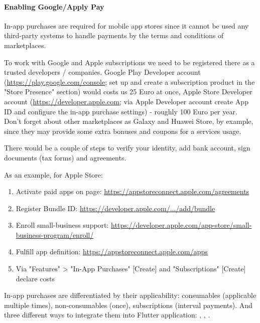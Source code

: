 \paragraph{Enabling Google/Apply Pay}

In-app purchases are required for mobile app stores since it cannot be used any third-party systems to handle payments
by the terms and conditions of marketplaces.

To work with Google and Apple subscriptions we need to be registered there as a trusted developers / companies. Google 
Play Developer account (\href{https://play.google.com/console}{https://play.google.com/console}; set up and create a 
subscription product in the "Store Presence" section) would costs us 25 Euro at once, Apple Store Developer 
account (\href{https://developer.apple.com}{https://developer.apple.com}; via Apple Developer account create App ID and 
configure the in-app purchase settings) - roughly 100 Euro per year. Don't forget about other marketplaces as 
Galaxy and Huawei Store, by example, since they may provide some extra bonuses and coupons for a services usage.

There would be a couple of steps to verify your identity, add bank account, sign documents (tax forms) and agreements.

As an example, for Apple Store:
\begin{enumerate}
  \item Activate paid apps on page: \href{https://appstoreconnect.apple.com/agreements}{https://appstoreconnect.apple.com/agreements}
  \item Register Bundle ID: \href{https://developer.apple.com/account/resources/identifiers/bundleId/add/bundle}{https://developer.apple.com/.../add/bundle}
  \item Enroll small-business support: \href{https://developer.apple.com/app-store/small-business-program/enroll/}{https://developer.apple.com/app-store/small-business-program/enroll/}
  \item Fulfill app definition: \href{https://appstoreconnect.apple.com/apps}{https://appstoreconnect.apple.com/apps}
  \item Via "Features" > "In-App Purchases" [Create] and "Subscriptions" [Create] declare costs
\end{enumerate}

In-app purchases are differentiated by their applicability: consumables (applicable multiple times), non-consumables 
(once), subscriptions (interval payments). And three different ways to integrate them into Flutter application:
, , .
